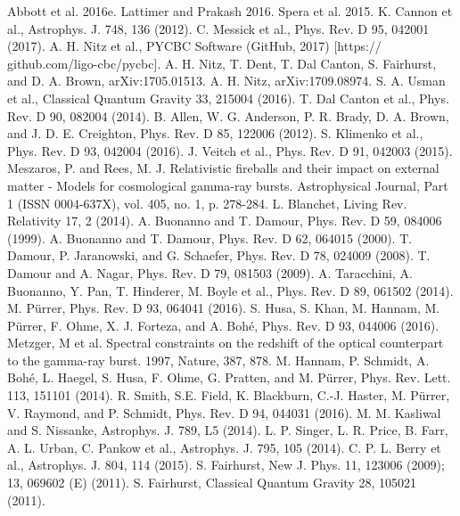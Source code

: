 \documentclass[binding=0.6cm, LaM]{sapthesis}
\begin{document}
\begin{thebibliography}{500}
	 Abbott et al. 2016e.
	 Lattimer and Prakash 2016.
	 Spera et al. 2015.
	 K. Cannon et al., Astrophys. J. 748, 136 (2012).
	 C. Messick et al., Phys. Rev. D 95, 042001 (2017).
	 A. H. Nitz et al., PYCBC Software (GitHub, 2017) [https:// github.com/ligo-cbc/pycbc].
	 A. H. Nitz, T. Dent, T. Dal Canton, S. Fairhurst, and D. A. Brown, arXiv:1705.01513.
	 A. H. Nitz, arXiv:1709.08974.
	 S. A. Usman et al., Classical Quantum Gravity 33, 215004 (2016).
	 T. Dal Canton et al., Phys. Rev. D 90, 082004 (2014). 
	 B. Allen, W. G. Anderson, P. R. Brady, D. A. Brown, and J. D. E. Creighton, Phys. Rev. D 85, 122006 (2012).
	 S. Klimenko et al., Phys. Rev. D 93, 042004 (2016).
	 J. Veitch et al., Phys. Rev. D 91, 042003 (2015).
	 Meszaros, P. and Rees, M. J. Relativistic fireballs and their impact on external matter - Models for cosmological gamma-ray bursts. Astrophysical Journal, Part 1 (ISSN 0004-637X), vol. 405, no. 1, p. 278-284. 
	 L. Blanchet, Living Rev. Relativity 17, 2 (2014).
	 A. Buonanno and T. Damour, Phys. Rev. D 59, 084006 (1999).
	 A. Buonanno and T. Damour, Phys. Rev. D 62, 064015 (2000).
	 T. Damour, P. Jaranowski, and G. Schaefer, Phys. Rev. D 78, 024009 (2008).
	 T. Damour and A. Nagar, Phys. Rev. D 79, 081503 (2009).
	 A. Taracchini, A. Buonanno, Y. Pan, T. Hinderer, M. Boyle et al., Phys. Rev. D 89, 061502 (2014).
	 M. Pürrer, Phys. Rev. D 93, 064041 (2016).
	 S. Husa, S. Khan, M. Hannam, M. Pürrer, F. Ohme, X. J. Forteza, and A. Bohé, Phys. Rev. D 93, 044006 (2016). 
	 Metzger, M et al. Spectral constraints on the redshift of the optical counterpart to the gamma-ray burst. 1997, Nature, 387, 878.
	 M. Hannam, P. Schmidt, A. Bohé, L. Haegel, S. Husa, F. Ohme, G. Pratten, and M. Pürrer, Phys. Rev. Lett. 113, 151101 (2014).
	 R. Smith, S.E. Field, K. Blackburn, C.-J. Haster, M. Pürrer, V. Raymond, and P. Schmidt, Phys. Rev. D 94, 044031 (2016).
	 M. M. Kasliwal and S. Nissanke, Astrophys. J. 789, L5 (2014). 
	 L. P. Singer, L. R. Price, B. Farr, A. L. Urban, C. Pankow et al., Astrophys. J. 795, 105 (2014). 
	 C. P. L. Berry et al., Astrophys. J. 804, 114 (2015). 
	 S. Fairhurst, New J. Phys. 11, 123006 (2009); 13, 069602 (E) (2011). 
 	 S. Fairhurst, Classical Quantum Gravity 28, 105021 (2011). 

\end{thebibliography}
\end{document}
